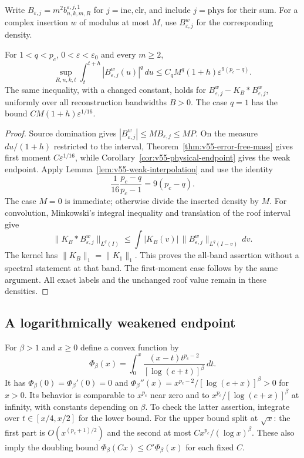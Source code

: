 Write $B_{\varepsilon,j}=m^2b^{\varepsilon,j,1}_{n,k,m,R}$ for
$j=\mathrm{inc},\mathrm{clr}$, and include $j=\mathrm{phys}$ for
their sum. For a complex insertion $w$ of modulus at most $M$, use
$B_{\varepsilon,j}^w$ for the corresponding density.
\begin{theorem}
\label{thm:v55-physical-remainders}
For $1<q<p_c$, $0<\varepsilon<\varepsilon_0$ and every $m\ge2$,
\begin{equation}\label{eq:v55-physical-Lq}
 \sup_{R,n,k,t}\int_t^{t+h}|B_{\varepsilon,j}^w(u)|^q\,du
       \le C_q M^q(1+h)\varepsilon^{9(p_c-q)}.
\end{equation}
The same inequality, with a changed constant, holds for
$B_{\varepsilon,j}^w-K_B*B_{\varepsilon,j}^w$, uniformly over all
reconstruction bandwidths $B>0$. The case $q=1$ has the bound
$CM(1+h)\varepsilon^{1/16}$.
\end{theorem}
\begin{proof}
Source domination gives
$|B_{\varepsilon,j}^w|\le M B_{\varepsilon,j}\le MP$.
On the measure $du/(1+h)$ restricted to the interval,
Theorem~\ref{thm:v55-error-free-mass} gives first moment
$C\varepsilon^{1/16}$, while
Corollary~\ref{cor:v55-physical-endpoint} gives the weak endpoint.
Apply Lemma~\ref{lem:v55-weak-interpolation} and use the identity
\[
 \frac1{16}\frac{p_c-q}{p_c-1}=9(p_c-q).
\]
The case $M=0$ is immediate; otherwise divide the inserted density
by $M$. For convolution, Minkowski's integral inequality and translation
of the roof interval give
\[
 \|K_B*B_{\varepsilon,j}^w\|_{L^q(I)}
 \le\int|K_B(v)|\,
                 \|B_{\varepsilon,j}^w\|_{L^q(I-v)}\,dv.
\]
The kernel has $\|K_B\|_1=\|K_1\|_1$. This proves the all-band
assertion without a spectral statement at that band. The first-moment
case follows by the same argument. All exact labels and the unchanged
roof value remain in these densities.
\end{proof}

\subsection{A logarithmically weakened endpoint}
For $\beta>1$ and $x\ge0$ define a convex function by
\begin{equation}\label{eq:v55-young-function}
 \Phi_\beta(x)=\int_0^x
       \frac{(x-t)t^{p_c-2}}{[\log(e+t)]^\beta}\,dt.
\end{equation}
It has $\Phi_\beta(0)=\Phi_\beta'(0)=0$ and
$\Phi_\beta''(x)=x^{p_c-2}/[\log(e+x)]^\beta>0$ for $x>0$.
Its behavior is comparable to $x^{p_c}$ near zero and to
$x^{p_c}/[\log(e+x)]^\beta$ at infinity, with constants depending
on $\beta$. To check the latter assertion, integrate over
$t\in[x/4,x/2]$ for the lower bound. For the upper bound split at
$\sqrt x$: the first part is $O(x^{(p_c+1)/2})$ and the second at
most $C x^{p_c}/(\log x)^\beta$. These also imply the doubling
bound $\Phi_\beta(Cx)\le C'\Phi_\beta(x)$ for each fixed $C$.


